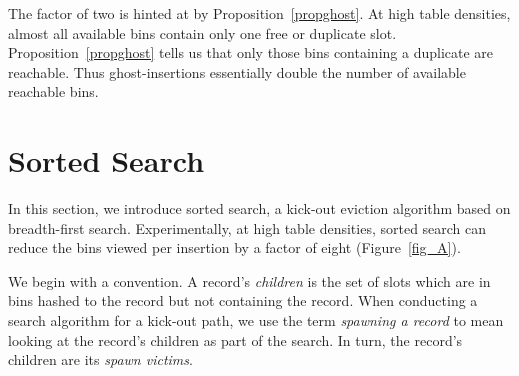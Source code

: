 \documentclass{sig-alternate-05-2015}
\begin{document}
The factor of two is hinted at by Proposition~\ref{propghost}. At high
table densities, almost all available bins contain only one free or
duplicate slot. Proposition~\ref{propghost} tells us that only those
bins containing a duplicate are reachable. Thus ghost-insertions
essentially double the number of available reachable bins.










































































\section{Sorted Search} \label{sec_sorted_search}

In this section, we introduce sorted search, a kick-out
eviction algorithm based on breadth-first search. Experimentally, at
high table densities, sorted search can reduce the bins viewed per
insertion by a factor of eight (Figure~\ref{fig_A}).

We begin with a convention. A record's \emph{children} is the set
of slots which are in bins hashed to the record but not containing the
record. When conducting a search algorithm for a kick-out path, we use
the term \emph{spawning a record} to mean looking at the record's
children as part of the search. In turn, the record's children are its
\emph{spawn victims}.
\end{document}
